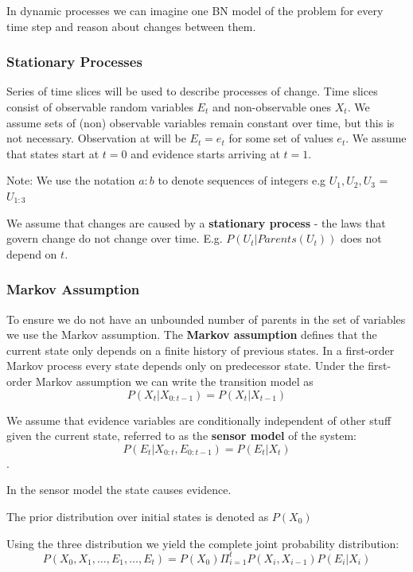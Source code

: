 \documentclass{article}
\begin{document}
In dynamic processes we can imagine one BN model of the problem for every time step and reason about changes between them. 

\subsubsection{Stationary Processes}

Series of time slices will be used to describe processes of change. Time slices consist of observable random variables $E_t$ and non-observable ones $X_t$. We assume sets of (non) observable variables remain constant over time, but this is not necessary. Observation at will be $E_t = e_t$ for some set of values $e_t$. We assume that states start at $t=0$ and evidence starts arriving at $t=1$.

Note: We use the notation $a:b$ to denote sequences of integers e.g $U_1, U_2, U_3$ = $U_{1:3}$

We assume that changes are caused by a \textbf{stationary process} - the laws that govern change do not change over time. E.g. $P(U_t | Parents(U_t))$ does not depend on $t$. 

\subsubsection{Markov Assumption}

To ensure we do not have an unbounded number of parents in the set of variables we use the Markov assumption. The \textbf{Markov assumption} defines that the current state only depends on a finite history of previous states. In a first-order Markov process every state depends only on predecessor state. Under the first-order Markov assumption we can write the transition model as $$P(X_t | X_{0:t-1}) = P(X_t | X_{t-1})$$

We assume that evidence variables are conditionally independent of other stuff given the current state, referred to as the \textbf{sensor model} of the system: $$P(E_t | X_{0:t}, E_{0:t-1}) = P(E_t | X_t)$$. 

In the sensor model the state causes evidence. \newline

The prior distribution over initial states is denoted as $P(X_0)$ \newline

Using the three distribution we yield the complete joint probability distribution: $$P(X_0, X_1, \ldots, E_1, \ldots, E_t) = P(X_0)\Pi_{i=1}^t P(X_i, X_{i-1})P(E_i | X_i)$$ \newline
\end{document}
